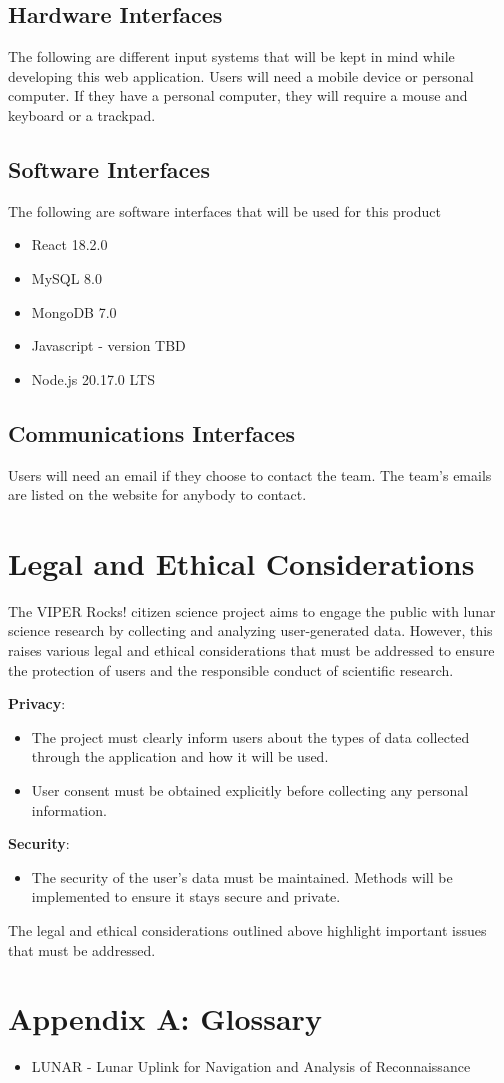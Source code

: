 \documentclass{article}
\begin{document}
\subsection{Hardware Interfaces}
The following are different input systems that will be kept in mind while developing this web application. Users will need a mobile device or personal computer. If they have a personal computer, they will require a mouse and keyboard or a trackpad.
\subsection{Software Interfaces}
The following are software interfaces that will be used for this product
\begin{itemize}
	\item React 18.2.0
	\item MySQL 8.0
	\item MongoDB 7.0
	\item Javascript - version TBD
	\item Node.js 20.17.0 LTS
\end{itemize}
\subsection{Communications Interfaces}
Users will need an email if they choose to contact the team. The team’s emails are listed on the website for anybody to contact.

\section{Legal and Ethical Considerations}
The VIPER Rocks! citizen science project aims to engage the public with lunar science research by collecting and analyzing user-generated data. However, this raises various legal and ethical considerations that must be addressed to ensure the protection of users and the responsible conduct of scientific research.

\textbf{Privacy}:
\begin{itemize}
	\item The project must clearly inform users about the types of data collected through the application and how it will be used.
	\item User consent must be obtained explicitly before collecting any personal information.
\end{itemize}
\textbf{Security}: 
\begin{itemize}
	\item The security of the user’s data must be maintained. Methods will be implemented to ensure it stays secure and private.
\end{itemize}
The legal and ethical considerations outlined above highlight important issues that must be addressed.

\section{Appendix A: Glossary}
\begin{itemize}
	\item LUNAR - Lunar Uplink for Navigation and Analysis of Reconnaissance
\end{itemize}
\end{document}
